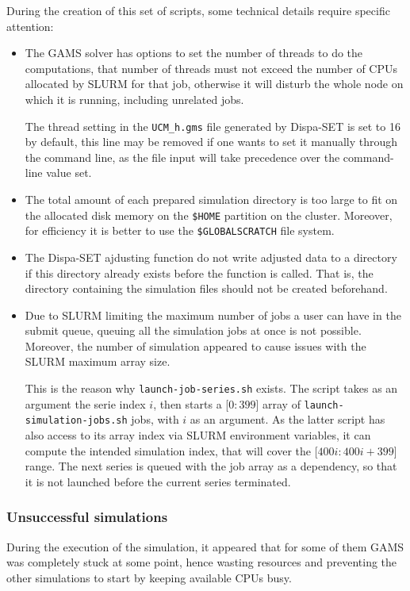 During the creation of this set of scripts, some technical details require specific attention:
\begin{itemize}
    \item The GAMS solver has options to set the number of threads to do the computations, that number of threads must not exceed the number of CPUs allocated by SLURM for that job, otherwise it will disturb the whole node on which it is running, including unrelated jobs.
    
    The thread setting in the \texttt{UCM\_h.gms} file generated by Dispa-SET is set to 16 by default, this line may be removed if one wants to set it manually through the command line, as the file input will take precedence over the command-line value set.
    \item The total amount of each prepared simulation directory is too large to fit on the allocated disk memory on the \texttt{\$HOME} partition on the cluster. Moreover, for efficiency it is better to use the \texttt{\$GLOBALSCRATCH} file system.
    \item The Dispa-SET ajdusting function do not write adjusted data to a directory if this directory already exists before the function is called. That is, the directory containing the simulation files should not be created beforehand.
    \item Due to SLURM limiting the maximum number of jobs a user can have in the submit queue, queuing all the simulation jobs at once is not possible. Moreover, the number of simulation appeared to cause issues with the SLURM maximum array size.

    This is the reason why \texttt{launch-job-series.sh} exists. The script takes as an argument the serie index $i$, then starts a [$0:399$] array of \texttt{launch-simulation-jobs.sh} jobs, with $i$ as an argument. As the latter script has also access to its array index via SLURM environment variables, it can compute the intended simulation index, that will cover the [$400i:400i+399$] range. The next series is queued with the job array as a dependency, so that it is not launched before the current series terminated.
\end{itemize}

\subsubsection{Unsuccessful simulations}

During the execution of the simulation, it appeared that for some of them GAMS was completely stuck at some point, hence wasting resources and preventing the other simulations to start by keeping available CPUs busy.

